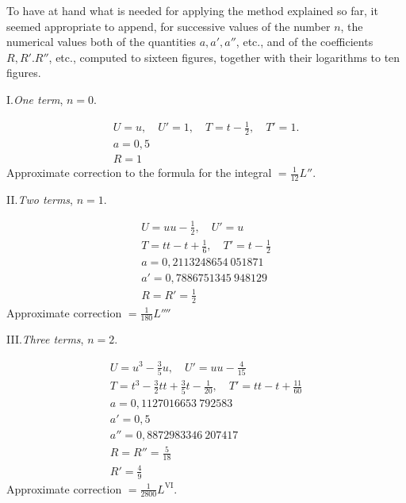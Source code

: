 To have at hand what is needed for applying the method explained so far, it seemed appropriate to append, for successive values of the number $n$, the numerical values both of the quantities $a,a',a''$, etc., and of the coefficients $R,R'.R''$, etc., computed to sixteen figures, together with their logarithms to ten figures.
\begingroup\renewcommand{\arraystretch}{1.6}
\par{}\begin{center}I.\quad\textit{One term}, \(n=0\).\end{center}
\[
\begin{array}{l}
U=u,\quad U'=1,\quad T=t-\frac{1}{2},\quad T'=1.\\
a=0{,}5\\
R=1
\end{array}
\]
\noindent Approximate correction to the formula for the integral \(=\frac{1}{12}L''\).

\par{}\begin{center}II.\quad\textit{Two terms}, \(n=1\).\end{center}
\[
\begin{array}{l}
U=uu-\frac{1}{2},\quad U'=u\\
T=tt-t+\frac{1}{6},\quad T'=t-\frac{1}{2}\\
a=0{,}2113248654\ 051871\\
a'=0{,}7886751345\ 948129\\
R=R'=\frac{1}{2}
\end{array}
\]
\noindent Approximate correction \(=\frac{1}{180}L''''\)

\par{}\begin{center}III.\quad\textit{Three terms}, \(n=2\).\end{center}
\[
\begin{array}{l}
U=u^3-\frac{3}{5}u,\quad U'=uu-\frac{4}{15}\\
T=t^3-\frac{3}{2}tt+\frac{3}{5}t-\frac{1}{20},\quad T'=tt-t+\frac{11}{60}\\
a=0{,}1127016653\ 792583\\
a'=0{,}5\\
a''=0{,}8872983346\ 207417\\
R=R''=\frac{5}{18}\\
R'=\frac{4}{9}
\end{array}
\]
\noindent Approximate correction \(=\frac{1}{2800}L^{\mathrm{VI}}\).

